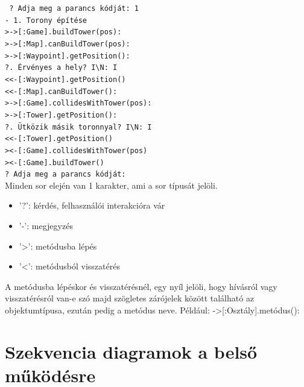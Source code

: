 \begingroup
\fontsize{10pt}{10pt}\selectfont
\texttt{
? Adja meg a parancs kódját: 1 \\
- 1. Torony építése \\
>\indent ->[:Game].buildTower(pos): \\
>\indent \indent ->[:Map].canBuildTower(pos): \\
>\indent \indent \indent ->[:Waypoint].getPosition(): \\
?\indent \indent {}. Érvényes a hely? I\textbackslash N: I \\
<\indent \indent \indent <-[:Waypoint].getPosition() \\
<\indent \indent <-[:Map].canBuildTower(): \\
>\indent \indent ->[:Game].collidesWithTower(pos): \\
>\indent \indent \indent ->[:Tower].getPosition(): \\
?\indent \indent {}. Ütközik másik toronnyal? I\textbackslash N: I \\
<\indent \indent \indent <-[:Tower].getPosition() \\
>\indent \indent <-[:Game].collidesWithTower(pos) \\
>\indent <-[:Game].buildTower() \\
? Adja meg a parancs kódját:
} \\
\endgroup
Minden sor elején van 1 karakter, ami a sor típusát jelöli.
\begin{itemize}
\item '?': kérdés, felhasználói interakcióra vár
\item '-': megjegyzés
\item '>': metódusba lépés
\item '<': metódusból visszatérés
\end{itemize}
A metódusba lépéskor és visszatérésnél, egy nyíl jelöli, hogy hívásról vagy visszatérésról van-e szó majd szögletes zárójelek között található az objektumtípusa, ezután pedig a metódus neve. Például: ->[:Osztály].metódus():

\section{Szekvencia diagramok a belső működésre}

